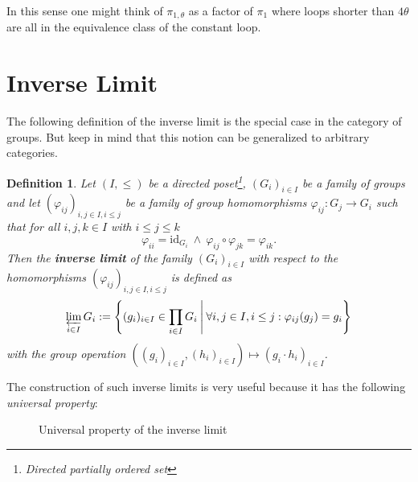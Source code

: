 \documentclass[a4paper, 11pt, twoside]{article}
\theoremstyle{break}
\theoremstyle{break}
\newtheorem{defin}[thm]{Definition}
\begin{document}
In this sense one might think of $\pi_{1,\theta}$ as a factor of $\pi_1$ where loops shorter than $4\theta$ are all in the equivalence class of the constant loop.

\section{Inverse Limit}

The following definition of the inverse limit is the special case in the category of groups. 
But keep in mind that this notion can be generalized to arbitrary categories.
\begin{defin}
  Let $(I, \leq)$ be a directed poset\footnote{Directed partially ordered set}, 
  $(G_i)_{i\in I}$ be a family of groups and let $(\varphi_{ij})_{i,j \in I, i \leq j}$ be a family of group homomorphisms $\varphi_{ij}\colon G_j \to G_i$ such that for all $i,j,k \in I$ with $i \leq j \leq k$
  \begin{equation*}
    \varphi_{ii} = \text{id}_{G_i} \: \land \: \varphi_{ij} \circ \varphi_{jk} = \varphi_{ik}.
  \end{equation*}
  Then the \textbf{inverse limit} of the family $(G_i)_{i\in I}$ with respect to the homomorphisms $(\varphi_{ij})_{i,j \in I, i \leq j}$ is defined as
  \begin{equation*}
    \varprojlim_{i\in I} G_i := \left\{(g_i)_{i\in I} \in \prod_{i\in I} G_i \: \middle| \: \forall i,j \in I, i \leq j: \varphi_{ij}(g_j) = g_i\right\}
  \end{equation*}
  with the group operation $((g_i)_{i\in I}, (h_i)_{i\in I}) \mapsto (g_i \cdot h_i)_{i\in I}$.
\end{defin}

The construction of such inverse limits is very useful because it has the following \textit{universal property}:
\begin{figure}[ht!]
  \centering
  \caption{Universal property of the inverse limit}\label{fig:inverse-limit}
\end{figure}
\end{document}
